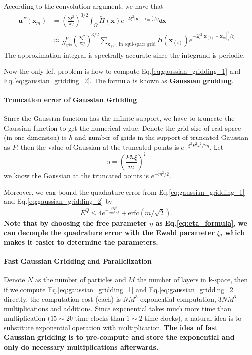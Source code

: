 \documentclass{article}[12pt]
\begin{document}
According to the convolution argument, we have that
\begin{align}
\mathbf{u}^F (\mathbf{x}_m) & =  \left(\frac{2 \xi^2}{\pi \eta}\right)^{3/2}  \int_{\Omega} \tilde{H}(\mathbf{x}) e^{-2 \xi^2 |\mathbf{x} - \mathbf{x}_m|_{\ast}^2 / \eta} \mathtt{d} \mathbf{x} \\
& \approx \frac{V}{N_{\text{grid}}} \left(\frac{2 \xi^2}{\pi \eta}\right)^{3/2} \sum_{\mathbf{x}_{(i)} \ \text{in equi-space grid}} \tilde{H}(\mathbf{x}_{(i)}) e^{-2 \xi^2 |\mathbf{x}_{(i)} - \mathbf{x}_m|_{\ast}^2 / \eta} \label{eq:gaussian_gridding_2}
\end{align}
The approximation integral is spectrally accurate since the integrand is periodic.

Now the only left problem is how to compute Eq.\eqref{eq:gaussian_gridding_1} and Eq.\eqref{eq:gaussian_gridding_2}. The formula is known as \textbf{Gaussian gridding}.

\paragraph{Truncation error of Gaussian Gridding}
Since the Gaussian function has the infinite support, we have to truncate the Gaussian function to get the numerical value. Denote the grid size of real space (in one dimension) is $h$ and number of grids in the support of truncated Gaussian as $P$, then the value of Gaussian at the truncated points is $e^{- \xi^2 P^2 h^2 / 2 \eta}$. Let 
\begin{equation}
\eta =  \left(\frac{P h \xi}{m} \right)^2 \label{eq:eta_formula}
\end{equation}
we know the Gaussian at the truncated points is $e^{-m^2/2}$.

Moreover, we can bound the quadrature error from  Eq.\eqref{eq:gaussian_gridding_1} and Eq.\eqref{eq:gaussian_gridding_2} by
\begin{equation}
E^Q \le  4 e^{- \frac{\pi^2 P^2}{2 m^2 L^2}} + \text{erfc} (m / \sqrt{2}).
\end{equation}
\textbf{Note that by choosing the free parameter $\eta$ as Eq.\eqref{eq:eta_formula}, we can decouple the quadrature error with the Ewald parameter $\xi$, which makes it easier to determine the parameters.}

\paragraph{Fast Gaussian Gridding and Parallelization} Denote $N$ as the number of particles and $M$ the number of layers in k-space, then if we compute Eq.\eqref{eq:gaussian_gridding_1} and Eq.\eqref{eq:gaussian_gridding_2} directly, the computation cost (each) is $NM^3$ exponential computation, $3NM^3$ multiplications and additions. Since exponential takes much more time than multiplication ($15 \sim 20$ time clocks than $1 \sim 2$ time clocks), a natural idea is to substitute exponential operation with multiplication. \textbf{The idea of fast Gaussian gridding is to pre-compute and store the exponential and only do necessary multiplications afterwards.}
\end{document}
